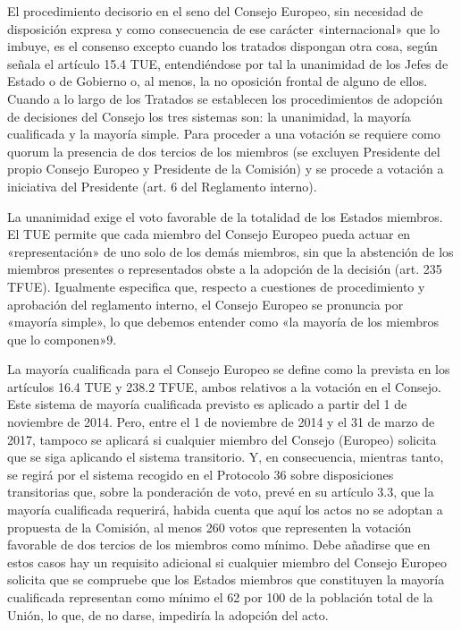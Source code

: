 \documentclass[10pt,a4paper]{article}
\begin{document}
El procedimiento decisorio en el seno del Consejo Europeo, sin necesidad de disposición expresa y como consecuencia de ese  carácter «internacional» que lo imbuye, es el consenso excepto cuando los tratados dispongan otra cosa, según señala el artículo  15.4 TUE, entendiéndose por tal la unanimidad de los Jefes de Estado o de Gobierno o, al menos, la no oposición frontal de alguno de ellos. Cuando a lo largo de los Tratados se establecen los procedimientos de adopción de decisiones del Consejo los tres sistemas son: la unanimidad, la mayoría cualificada y la mayoría simple. Para proceder a una votación se requiere como quorum la presencia de dos tercios de los miembros (se excluyen Presidente del propio Consejo Europeo y Presidente de la Comisión) y se procede a votación a iniciativa del Presidente (art. 6 del Reglamento interno).

La unanimidad exige el voto favorable de la totalidad de los Estados miembros. El TUE permite que cada miembro del Consejo Europeo pueda actuar en «representación» de uno solo de los demás miembros, sin que la abstención de los miembros presentes o representados obste a la adopción de la decisión (art. 235 TFUE). Igualmente especifica que, respecto a cuestiones de procedimiento y aprobación del reglamento interno, el Consejo Europeo se pronuncia por «mayoría simple», lo que debemos entender como «la mayoría de los miembros que lo componen»9.

La mayoría cualificada para el Consejo Europeo se define como la prevista en los artículos 16.4 TUE y 238.2 TFUE, ambos relativos a la votación en el Consejo. Este sistema de mayoría cualificada previsto es aplicado a partir del 1 de noviembre de 2014. Pero, entre el 1 de noviembre de 2014 y el 31 de marzo de 2017, tampoco se aplicará si cualquier miembro del Consejo (Europeo) solicita que se siga aplicando el sistema transitorio. Y, en consecuencia, mientras tanto, se regirá por el sistema recogido en el Protocolo 36 sobre disposiciones transitorias que, sobre la ponderación de voto, prevé en su artículo 3.3, que la mayoría cualificada requerirá, habida cuenta que aquí los actos no se adoptan a propuesta de la Comisión, al menos 260 votos que representen la votación favorable de dos tercios de los miembros como mínimo. Debe añadirse que en estos casos hay un requisito adicional si cualquier miembro del Consejo Europeo solicita que se compruebe que los Estados miembros que constituyen la mayoría cualificada representan como mínimo el 62 por 100 de la población total de la Unión, lo que, de no darse, impediría la adopción del acto.
\end{document}
